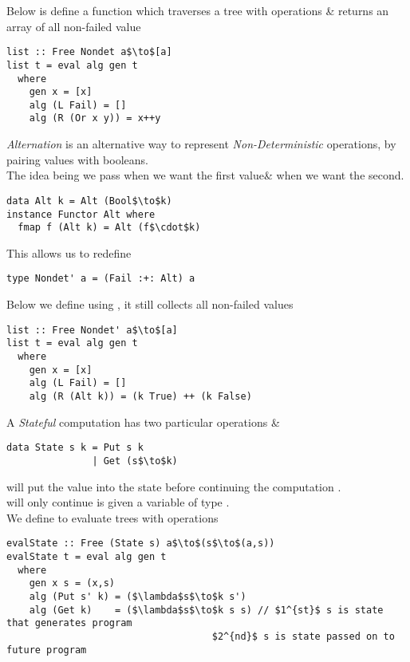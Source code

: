 \documentclass[11pt,a4paper]{article}
\begin{document}
Below is define a function {} which traverses a {} tree with {} operations \& returns an array of all non-failed value
\begin{lstlisting}
list :: Free Nondet a$\to$[a]
list t = eval alg gen t
  where
    gen x = [x]
    alg (L Fail) = []
    alg (R (Or x y)) = x++y
\end{lstlisting}

\textit{Alternation} is an alternative way to represent \textit{Non-Deterministic} operations, by pairing values with booleans.\\
The idea being we pass {} when we want the first value\& {}  when we want the second.
\begin{lstlisting}
data Alt k = Alt (Bool$\to$k)
instance Functor Alt where
  fmap f (Alt k) = Alt (f$\cdot$k)
\end{lstlisting}
This allows us to redefine {}
\begin{lstlisting}
type Nondet' a = (Fail :+: Alt) a
\end{lstlisting}

Below we define {} using {}, it still collects all non-failed values
\begin{lstlisting}
list :: Free Nondet' a$\to$[a]
list t = eval alg gen t
  where
    gen x = [x]
    alg (L Fail) = []
    alg (R (Alt k)) = (k True) ++ (k False)
\end{lstlisting}

A \textit{Stateful} computation has two particular operations {} \& {}
\begin{lstlisting}
data State s k = Put s k
               | Get (s$\to$k)
\end{lstlisting}
{} will put the value {} into the state before continuing the computation {}.\\
{} will only continue {} is given a variable of type {}.\\

We define {} to evaluate {} trees with {} operations
\begin{lstlisting}
evalState :: Free (State s) a$\to$(s$\to$(a,s))
evalState t = eval alg gen t
  where
    gen x s = (x,s)
    alg (Put s' k) = ($\lambda$s$\to$k s')
    alg (Get k)    = ($\lambda$s$\to$k s s) // $1^{st}$ s is state that generates program
                                    $2^{nd}$ s is state passed on to future program
\end{lstlisting}
\end{document}

